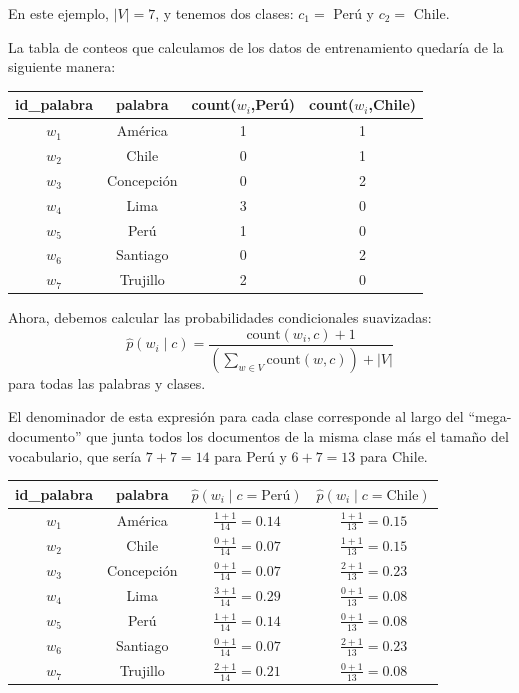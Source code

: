 \documentclass[11pt,fleqn]{book} %
\begin{document}
En este ejemplo, $|V|=7$, y tenemos dos clases: $c_1=$ Perú y $c_2=$ Chile.

La tabla de conteos que calculamos de los datos de entrenamiento quedaría de la siguiente manera:

\begin{table}[h]
\centering
\begin{tabular}{|c|c|c|c|}
\hline
id\_palabra & palabra & count($w_i$,Perú) & count($w_i$,Chile) \\
\hline
$w_1$ & América & 1 & 1 \\
$w_2$ & Chile & 0 & 1 \\
$w_3$ & Concepción & 0 & 2 \\
$w_4$ & Lima & 3 & 0 \\
$w_5$ & Perú & 1 & 0 \\
$w_6$ & Santiago & 0 & 2 \\
$w_7$ & Trujillo & 2 & 0 \\
\hline
\end{tabular}
\end{table}

Ahora, debemos calcular las probabilidades condicionales suavizadas:
\[
\hat{p}(w_i \mid c) = \frac{\text{count}(w_i, c) + 1}{\left(\sum_{w \in V} \text{count}(w, c)\right) + |V|}
\]
para todas las palabras y clases.

El denominador de esta expresión para cada clase corresponde al largo del ``mega-documento'' que junta todos los documentos de la misma clase más el tamaño del vocabulario, que sería $7+7=14$ para Perú y $6+7=13$ para Chile.

\begin{table}[h]
\centering
\begin{tabular}{|c|c|c|c|}
\hline
id\_palabra & palabra & $\hat{p}(w_i \mid c=\text{Perú})$ & $\hat{p}(w_i \mid c=\text{Chile})$ \\
\hline
$w_1$ & América & $\frac{1+1}{14}=0.14$ & $\frac{1+1}{13}=0.15$ \\
$w_2$ & Chile & $\frac{0+1}{14}=0.07$ & $\frac{1+1}{13}=0.15$ \\
$w_3$ & Concepción & $\frac{0+1}{14}=0.07$ & $\frac{2+1}{13}=0.23$ \\
$w_4$ & Lima & $\frac{3+1}{14}=0.29$ & $\frac{0+1}{13}=0.08$ \\
$w_5$ & Perú & $\frac{1+1}{14}=0.14$ & $\frac{0+1}{13}=0.08$ \\
$w_6$ & Santiago & $\frac{0+1}{14}=0.07$ & $\frac{2+1}{13}=0.23$ \\
$w_7$ & Trujillo & $\frac{2+1}{14}=0.21$ & $\frac{0+1}{13}=0.08$ \\
\hline
\end{tabular}
\end{table}
\end{document}

